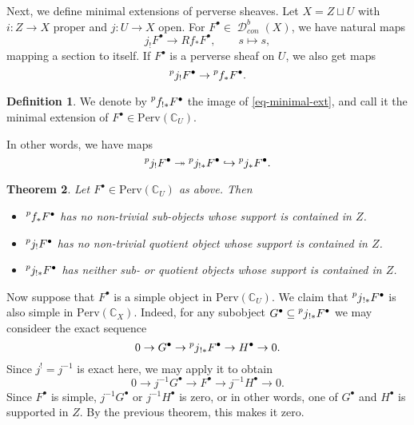 \documentclass[12pt]{amsart}
\newcommand{\C}{\mathbb{C}}
\DeclareMathOperator{\D}{\mathcal{D}}
\newtheorem{theorem}{Theorem}[section]
\theoremstyle{definition}
\newtheorem{definition}[theorem]{Definition}
\newtheorem{example}[theorem]{Example}
\theoremstyle{remark}
\numberwithin{equation}{section}
\begin{document}


Next, we define minimal extensions of perverse sheaves. Let $X = Z \sqcup U$ with $i: Z \to X$ proper and $j: U \to X$ open.
For $F^\bullet \in \D^b_{con}(X)$, we have natural maps
\begin{equation*}
    j_! F^\bullet \to Rf_* F^\bullet,\qquad s \mapsto s,
\end{equation*}
mapping a section to itself. If $F^\bullet$ is a perverse sheaf on $U$, we also get maps
\begin{equation} \label{eq-minimal-ext}
    \prescript{p}{}{j_!} F^\bullet \to \prescript{p}{}{f_*} F^\bullet.
\end{equation}

\begin{definition}
    We denote by $\prescript{p}{}{f_{!*}} F^\bullet$ the image of \eqref{eq-minimal-ext}, and call it the minimal extension of $F^\bullet \in \text{Perv}(\C_U)$.
\end{definition}
In other words, we have maps
\begin{equation}
    \prescript{p}{}{j_!} F^\bullet \twoheadrightarrow \prescript{p}{}{j_{!*}} F^\bullet
    \hookrightarrow \prescript{p}{}{j_*} F^\bullet.
\end{equation}

\begin{theorem}
    Let $F^\bullet \in \text{Perv}(\C_U)$ as above. Then
    \begin{itemize}
        \item[(i)] $\prescript{p}{}{f_*} F^\bullet$ has no non-trivial sub-objects whose support is contained in $Z$.
        \item[(ii)] $\prescript{p}{}{j_!} F^\bullet$ has no non-trivial quotient object whose support is contained in $Z$.
        \item[(iii)] $\prescript{p}{}{j_{!*}} F^\bullet$ has neither sub- or quotient objects whose support is contained in $Z$.
    \end{itemize}
\end{theorem}

Now suppose that $F^\bullet$ is a simple object in $\text{Perv}(\C_U)$.
We claim that $\prescript{p}{}{j}_{!*} F^\bullet$ is also simple in 
$\text{Perv}(\C_X)$. Indeed, for any subobject 
$G^\bullet \subseteq \prescript{p}{}{j}_{!*} F^\bullet$ we may consideer the exact sequence
\begin{equation}
    0 \to G^\bullet \to \prescript{p}{}{j}_{!*} F^\bullet \to H^\bullet \to 0.
\end{equation}
Since $j^! = j^{-1}$ is exact here, we may apply it to obtain
\begin{equation}
    0 \to j^{-1} G^\bullet \to F^\bullet \to j^{-1} H^\bullet \to 0.
\end{equation}
Since $F^\bullet$ is simple, $j^{-1}G^\bullet$ or $j^{-1} H^\bullet$ is zero,
or in other words, one of $G^\bullet$ and $H^\bullet$ is supported in $Z$.
By the previous theorem, this makes it zero.
\end{document}
